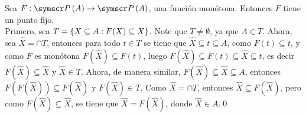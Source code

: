 \item Sea \(F: \fps{A} \rightarrow \fps{A}\), una función monótona. Entonces \(F\) tiene un punto fijo. \\
    Primero, sea \(T = \left\{  X \subseteq A : F(X) \subseteq X \right\}\). Note que \(T \neq \emptyset\), ya que \(A \in T\).
    Ahora, sea \(\hat{X} = \cap T\), entonces para todo \(t \in T\) se tiene que \(\hat{X} \subseteq t \subseteq A\),
    como \(F(t) \subseteq t\), y como \(F\) es monótona \(F(\hat{X}) \subseteq F(t)\), 
    luego \(F(\hat{X}) \subseteq F(t) \subseteq \hat{X} \subseteq t\), es decir \(F(\hat{X}) \subseteq \hat{X}\) y \(\hat{X} \in T\).
    Ahora, de manera similar, \(F(\hat{X}) \subseteq \hat{X} \subseteq A\), entonces \(F(F(\hat{X})) \subseteq F(\hat{X})\) y \(F(\hat{X}) \in T\).
    Como \(\hat{X} = \cap T\), entonces \(\hat{X} \subseteq F(\hat{X})\), pero como \(F(\hat{X}) \subseteq \hat{X}\), 
    se tiene que \(\hat{X} = F(\hat{X})\), donde \(\hat{X} \in A\).\qed{}
